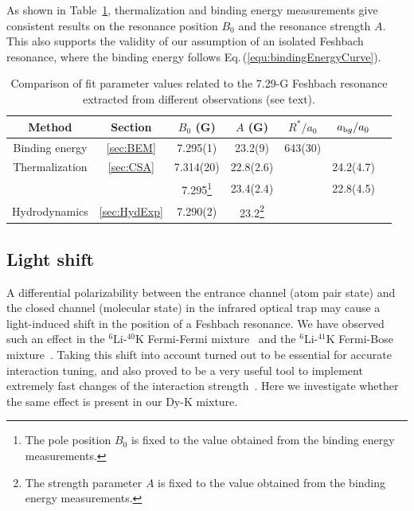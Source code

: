 As shown in Table~\ref{tab:ParametersAt7G}, thermalization and binding energy measurements give consistent results on the resonance position $B_0$ and the resonance strength $A$. This also supports the validity of our assumption of an isolated Feshbach resonance, where the binding energy follows Eq.\,(\ref{equ:bindingEnergyCurve}).

\begin{table}[htb]
	\caption{\label{tab:ParametersAt7G} Comparison of fit parameter values related to the 7.29-G Feshbach resonance extracted from different observations (see text).}
		\begin{tabular}{ccccccc}
			\hline
			\hline
			Method &Section&$B_0$ (G)& $A$ (G) &$R^*/a_0$ &$a_{\textrm bg}/a_0$\\
			\hline
			Binding energy&\ref{sec:BEM}&7.295(1)  &23.2(9) &643(30) & ~\\
			\multicolumn{1}{c}{{Thermalization}} & \multicolumn{1}{c}{{\ref{sec:CSA}}}&{7.314(20)} &{22.8(2.6)}  &~&{24.2(4.7)}\\
			\multicolumn{1}{c}{}& \multicolumn{1}{c}{}&{7.295\footnote{The pole position $B_0$ is fixed to the value obtained from the binding energy measurements.}} &{23.4(2.4)}  &~  &{22.8(4.5)}\\
			Hydrodynamics&\ref{sec:HydExp}&7.290(2) &23.2\footnote{The strength parameter $A$ is fixed to the value obtained from the binding energy measurements.}&~&~\\
			\hline
			\hline
		\end{tabular}
\end{table}

\subsection{\label{sec:Lightshift}Light shift}

A differential polarizability between the entrance channel (atom pair state) and the closed channel (molecular state) in the infrared optical trap may cause a light-induced shift in the position of a Feshbach resonance. We have observed such an effect in the $^6$Li-$^{40}$K Fermi-Fermi mixture~\cite{Jag2014ooa} and the $^6$Li-$^{41}$K Fermi-Bose mixture~\cite{Lous2018pti}. Taking this shift into account turned out to be essential for accurate interaction tuning, and also proved to be a very useful tool to implement extremely fast changes of the interaction strength~\cite{Cetina2016umb}. Here we investigate whether the same effect is present in our Dy-K mixture.

